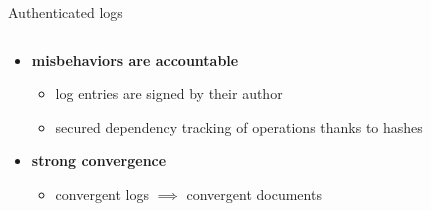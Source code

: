 \documentclass[xcolor=table]{beamer}
\newenvironment{utikzhbgraph}{%
    \newcommand{\uevent}[3]{\node[event] (##1) at (##2) {};\node[] at (##1) {##3};}%
    \newcommand{\uhb}[2]{\draw[precedes] (##1) to (##2);}%
    \newcommand{\ulabelled}[2]{\node[ulabel,below left=-1pt and -4pt of ##1] (l##1) {};\node[] at (l##1) {##2};}%
    \newcommand{\uembedded}[3]{%
        \node[##2=-7.5pt and -7.5pt of ##1] (uembeddedp0##1) {};%
        \node[##2=10pt and 1pt of ##1] (uembeddedp1##1) {};%
        \draw[-Circle] (uembeddedp1##1) to (uembeddedp0##1);%
        \node[##2=-10pt and -7pt of uembeddedp1##1] {##3};}%
    \newcommand{\uparticipants}[3]{\uembedded{##1}{##2}{$\left\{##3\right\}$}}%
    \begin{tikzpicture}%
}{%
    \end{tikzpicture}%
}
\begin{document}
\begin{frame}{Authenticated logs}
\begin{columns}
    \end{columns}
    \begin{itemize}
        \item \textbf{misbehaviors are accountable}
        \begin{itemize}
            \item log entries are signed by their author
            \item secured dependency tracking of operations thanks to hashes
        \end{itemize}
        \item<2> \textbf{strong convergence}
        \begin{itemize}
            \item<2> convergent logs $\implies$ convergent documents
        \end{itemize}
    \end{itemize}
    \vspace{1em}
\end{frame}
\end{document}
